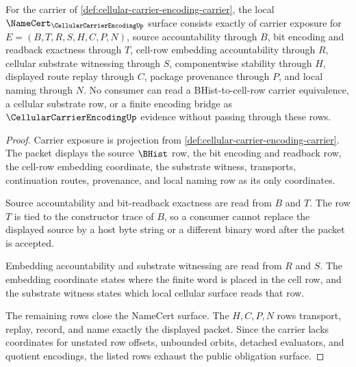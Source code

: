 \begin{theorem}
\label{thm:cellular-carrier-encoding-namecert-obligations}
For the carrier of \autoref{def:cellular-carrier-encoding-carrier}, the local $\NameCert_{\CellularCarrierEncodingUp}$ surface consists exactly of carrier exposure for $E=(B,T,R,S,H,C,P,N)$, source accountability through $B$, bit encoding and readback exactness through $T$, cell-row embedding accountability through $R$, cellular substrate witnessing through $S$, componentwise stability through $H$, displayed route replay through $C$, package provenance through $P$, and local naming through $N$. No consumer can read a BHist-to-cell-row carrier equivalence, a cellular substrate row, or a finite encoding bridge as $\CellularCarrierEncodingUp$ evidence without passing through these rows.
\end{theorem}
\begin{proof}
Carrier exposure is projection from \autoref{def:cellular-carrier-encoding-carrier}. The packet displays the source $\BHist$ row, the bit encoding and readback row, the cell-row embedding coordinate, the substrate witness, transports, continuation routes, provenance, and local naming row as its only coordinates.

Source accountability and bit-readback exactness are read from $B$ and $T$. The row $T$ is tied to the constructor trace of $B$, so a consumer cannot replace the displayed source by a host byte string or a different binary word after the packet is accepted.

Embedding accountability and substrate witnessing are read from $R$ and $S$. The embedding coordinate states where the finite word is placed in the cell row, and the substrate witness states which local cellular surface reads that row.

The remaining rows close the NameCert surface. The $H,C,P,N$ rows transport, replay, record, and name exactly the displayed packet. Since the carrier lacks coordinates for unstated row offsets, unbounded orbits, detached evaluators, and quotient encodings, the listed rows exhaust the public obligation surface.
\end{proof}

